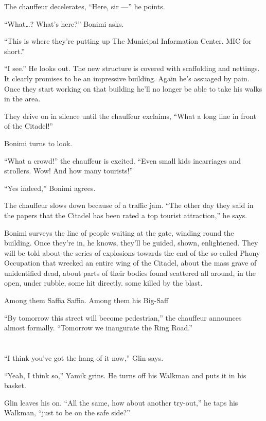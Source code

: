 \documentclass[twoside,11pt,openany]{book}
\begin{document}
The chauffeur decelerates, ``Here, sir ---'' he points.

``What{\ldots}? What's here?'' Bonimi asks.

``This is where they're putting up The Municipal Information Center. MIC for short.''

``I see.'' He looks out. The new structure is covered with scaffolding and nettings.
It{ }clearly promises to be an impressive building. Again he's assuaged by pain. Once they start
working on that building he'll no longer be able to take his walks in the area.

They drive on in silence until the chauffeur exclaims, ``What a long line in front of the
Citadel!''

Bonimi turns to look.

``What a crowd!'' the chauffeur is excited.
``Even small kids in\linebreak[3] carriages and strollers. Wow! And how many tourists!''

``Yes indeed,'' Bonimi agrees.

The chauffeur slows down because of a traffic jam. ``The other day they said in the papers that the
Citadel has been rated a top tourist attraction,'' he says.

Bonimi surveys the line of people waiting at the gate, winding round the building. Once they're in, he knows, they'll be
guided, shown, enlightened. They will be told about the series of explosions towards the end of the so-called Phony
Occupation that wrecked an entire wing of the Citadel, about the mass grave of unidentified dead, about parts of their
bodies found scattered all around, in the open, under rubble, some hit directly. some killed by the blast.

Among them Saffia Saffia. Among them his Big-Saff

``By tomorrow this street will become pedestrian,'' the chauffeur announces almost formally.
``Tomorrow we inaugurate the Ring Road.''


\chapter{}

``I think you've got the hang of it now,'' Glin says.

``Yeah, I think so,'' Yamik grins. He turns off his Walkman and puts it in his basket.

Glin leaves his on. ``All the same, how about another try-out,'' he taps his Walkman, ``just
to be on the safe side?''
\end{document}
